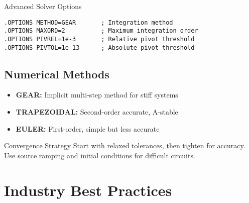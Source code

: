 \documentclass{beamer}
\begin{document}
\begin{frame}{Advanced Solver Options}
    \begin{lstlisting}
.OPTIONS METHOD=GEAR       ; Integration method
.OPTIONS MAXORD=2          ; Maximum integration order
.OPTIONS PIVREL=1e-3       ; Relative pivot threshold
.OPTIONS PIVTOL=1e-13      ; Absolute pivot threshold
    \end{lstlisting}
    
    \subsection{Numerical Methods}
    \begin{itemize}
        \item \textbf{GEAR:} Implicit multi-step method for stiff systems
        \item \textbf{TRAPEZOIDAL:} Second-order accurate, A-stable
        \item \textbf{EULER:} First-order, simple but less accurate
    \end{itemize}
    
    \begin{exampleblock}{Convergence Strategy}
        Start with relaxed tolerances, then tighten for accuracy. Use source ramping and initial conditions for difficult circuits.
    \end{exampleblock}
\end{frame}

\section{Industry Best Practices}
\end{document}
